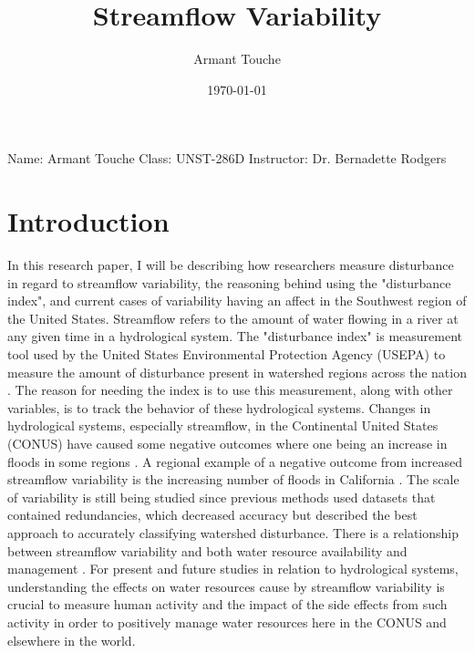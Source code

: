 \documentclass[a4paper,man,biblatex]{apa7}
\title{Streamflow Variability}
\author{Armant Touche}
\affiliation{Portland State University}
\date{\today}
\begin{document}
\noindent Name: Armant Touche\newline
\noindent Class: UNST-286D\newline
\noindent Instructor: Dr. Bernadette Rodgers\newline
\section{Introduction} 
\par In this research paper, I will be describing how researchers measure disturbance in regard to streamflow variability, the reasoning behind  using the "disturbance index", and current cases of variability having an affect in the Southwest region of the United States. Streamflow refers to the amount of water flowing in a river at any given time \autocite{streamflow_def} in a hydrological system. The "disturbance index" is measurement tool used by the United States Environmental Protection Agency (USEPA) to measure the amount of disturbance present in watershed regions across the nation \autocite{falcone_2016}. The reason for needing the index is to use this measurement, along with other variables, is to track the behavior of these hydrological systems. Changes in hydrological systems, especially streamflow, in the Continental United States (CONUS) have caused some negative outcomes where one being an increase in floods in some regions \autocite{rice_2016}. A regional example of a negative outcome from increased streamflow variability is the increasing number of floods in California \autocite{standford_2020}. The scale of variability is still being studied since previous methods used datasets that contained redundancies, which decreased accuracy but \textcite{falcone_2016} described the best approach to accurately classifying watershed disturbance. There is a relationship between streamflow variability and both water resource availability and management \autocite{rice_2016}. For present and future studies in relation to hydrological systems, understanding the effects on water resources cause by streamflow variability is crucial to measure human activity and the impact of the side effects from such activity in order to positively manage water resources here in the CONUS and elsewhere in the world.\\
\end{document}
